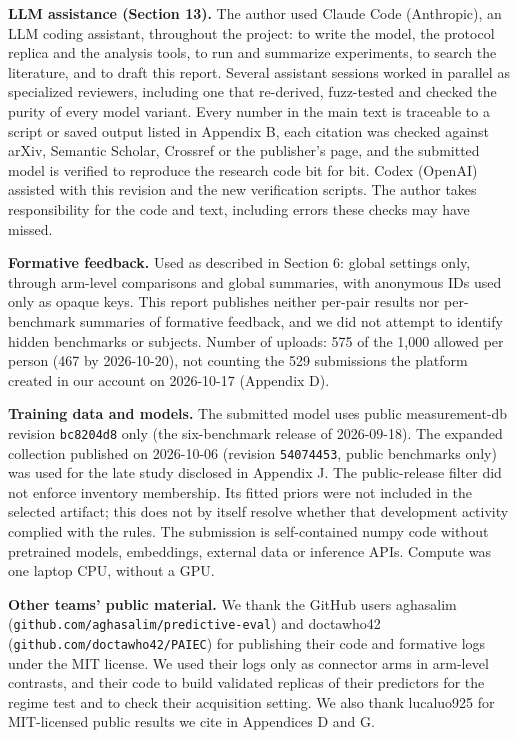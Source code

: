 \documentclass[
]{article}
\begin{document}
\textbf{LLM assistance (Section 13).} The author used Claude Code
(Anthropic), an LLM coding assistant, throughout the project: to write
the model, the protocol replica and the analysis tools, to run and
summarize experiments, to search the literature, and to draft this
report. Several assistant sessions worked in parallel as specialized
reviewers, including one that re-derived, fuzz-tested and checked the
purity of every model variant. Every number in the main text is
traceable to a script or saved output listed in Appendix B, each
citation was checked against arXiv, Semantic Scholar, Crossref or the
publisher's page, and the submitted model is verified to reproduce the
research code bit for bit. Codex (OpenAI) assisted with this revision
and the new verification scripts. The author takes responsibility for
the code and text, including errors these checks may have missed.

\textbf{Formative feedback.} Used as described in Section 6: global
settings only, through arm-level comparisons and global summaries, with
anonymous IDs used only as opaque keys. This report publishes neither
per-pair results nor per-benchmark summaries of formative feedback, and
we did not attempt to identify hidden benchmarks or subjects. Number of
uploads: 575 of the 1,000 allowed per person (467 by 2026-10-20), not
counting the 529 submissions the platform created in our account on
2026-10-17 (Appendix D).

\textbf{Training data and models.} The submitted model uses public
measurement-db revision \texttt{bc8204d8} only (the six-benchmark
release of 2026-09-18). The expanded collection published on 2026-10-06
(revision \texttt{54074453}, public benchmarks only) was used for the
late study disclosed in Appendix J. The public-release filter did not
enforce inventory membership. Its fitted priors were not included in the
selected artifact; this does not by itself resolve whether that
development activity complied with the rules. The submission is
self-contained numpy code without pretrained models, embeddings,
external data or inference APIs. Compute was one laptop CPU, without a
GPU.

\textbf{Other teams' public material.} We thank the GitHub users
aghasalim (\texttt{github.com/aghasalim/predictive-eval}) and doctawho42
(\texttt{github.com/doctawho42/PAIEC}) for publishing their code and
formative logs under the MIT license. We used their logs only as
connector arms in arm-level contrasts, and their code to build validated
replicas of their predictors for the regime test and to check their
acquisition setting. We also thank lucaluo925 for MIT-licensed public
results we cite in Appendices D and G.
\end{document}
